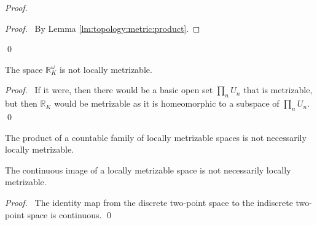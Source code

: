 \begin{proof}
\pf
{}
\begin{proof}
  \pf\ By Lemma \ref{lm:topology:metric:product}.
\end{proof}
\qed
\end{proof}

\begin{prop}
The space $\mathbb{R}_K^\omega$ is not locally metrizable.
\end{prop}

\begin{proof}
\pf\ If it were, then there would be a basic open set $\prod_n U_n$ that is metrizable, but then $\mathbb{R}_K$ would be metrizable as it is homeomorphic to a subspace of $\prod_n U_n$. \qed
\end{proof}

\begin{cor}
The product of a countable family of locally metrizable spaces is not necessarily locally metrizable.
\end{cor}

\begin{prop}
The continuous image of a locally metrizable space is not necessarily locally metrizable.
\end{prop}

\begin{proof}
\pf\ The identity map from the discrete two-point space to the indiscrete two-point space is continuous. \qed
\end{proof}
